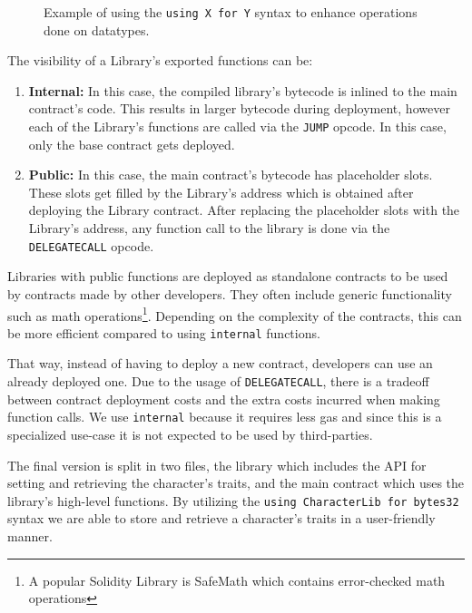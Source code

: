 \begin{figure}[ht!]
    \centering
    
    \caption{Example of using the \texttt{using X for Y} syntax to enhance operations done on datatypes.}
    \label{fig:library}
\end{figure}

The visibility of a Library's exported functions can be: 
\begin{enumerate}
    \item \textbf{Internal:}
        In this case, the compiled library's bytecode is inlined to the main contract's code. This results in larger bytecode during deployment, however each of the Library's functions are called via the \texttt{JUMP} opcode. In this case, only the base contract gets deployed.
    \item \textbf{Public:}
        In this case, the main contract's bytecode has placeholder slots. These slots get filled by the Library's address which is obtained after deploying the Library contract. After replacing the placeholder slots with the Library's address, any function call to the library is done via the \texttt{DELEGATECALL} opcode.
\end{enumerate}


Libraries with public functions are deployed as standalone contracts to be used by contracts made by other developers. They often include generic functionality such as math operations\footnote{A popular Solidity Library is SafeMath which contains error-checked math operations}. Depending on the complexity of the contracts, this can be more efficient compared to using \texttt{internal} functions. %

That way, instead of having to deploy a new contract, developers can use an already deployed one. Due to the usage of \texttt{DELEGATECALL}, there is a tradeoff between contract deployment costs and the extra costs incurred when making function calls. We use \texttt{internal} because it requires less gas and since this is a specialized use-case it is not expected to be used by third-parties.

The final version is split in two files, the library which includes the API for setting and retrieving the character's traits, and the main contract which uses the library's high-level functions. By utilizing the \texttt{using CharacterLib for bytes32} syntax we are able to store and retrieve a character's traits in a user-friendly manner.


